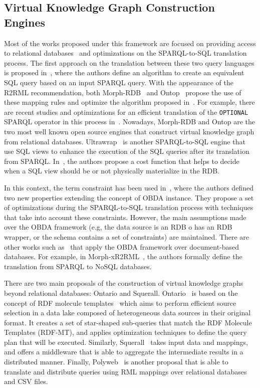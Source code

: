 \subsection{Virtual Knowledge Graph Construction Engines}
Most of the works proposed under this framework are focused on providing access to relational databases~\citep{priyatna2014formalisation,calvanese2017ontop,sequeda2013ultrawrap} and optimizations on the  SPARQL-to-SQL translation process. The first approach on the translation between these two query languages is proposed in~\citep{chebotko2009semantics}, where the authors define an algorithm to create an equivalent SQL query based on an input SPARQL query. With the appearance of the R2RML recommendation, both Morph-RDB~\citep{priyatna2014formalisation} and Ontop~\citep{calvanese2017ontop} propose the use of these mapping rules and optimize the algorithm proposed in~\citep{chebotko2009semantics}. For example, there are recent studies and optimizations for an efficient translation of the \texttt{OPTIONAL} SPARQL operator in this process in~\citep{xiao2018efficient}. Nowadays, Morph-RDB and Ontop are the two most well known open source engines that construct virtual knowledge graph from relational databases. Ultrawrap~\citep{sequeda2013ultrawrap,sequeda2014obda} is another SPARQL-to-SQL engine that use SQL views to enhance the execution of the SQL queries after its translation from SPARQL. In~\citep{sequeda2014obda}, the authors propose a cost function that helps to decide when a SQL view should be or not physically materialize in the RDB.

In this context, the term constraint has been used in~\citep{hovland2016obda}, where the authors defined two new properties extending the concept of OBDA instance. They propose a set of optimizations during the SPARQL-to-SQL translation process with techniques that take into account these constraints. However, the main assumptions made over the OBDA framework (e.g, the data source is an RDB o has an RDB wrapper, or the schema contains a set of constraints) are maintained. There are other works such as~\citep{michel2015translation,botoeva2019ontology} that apply the OBDA framework over document-based databases. For example, in Morph-xR2RML~\citep{michel2015translation}, the authors formally define the translation from SPARQL to NoSQL databases.

There are two main proposals of the construction of virtual knowledge graphs beyond relational databases: Ontario and Squerall. Ontario~\citep{endris2019ontario} is based on the concept of RDF molecule templates~\citep{endris2017mulder} which aims to perform efficient source selection in a data lake composed of heterogeneous data sources in their original format. It creates a set of star-shaped sub-queries that match the RDF Molecule Templates (RDF-MT), and applies optimization techniques to define the query plan that will be executed. Similarly, Squerall~\citep{mami2019querying} takes input data and mappings, and offers a middleware that is able to aggregate the intermediate results in a distributed manner. Finally, Polyweb~\citep{khan2019one} is another proposal that is able to translate and distribute queries using RML mappings over relational databases and CSV files.



